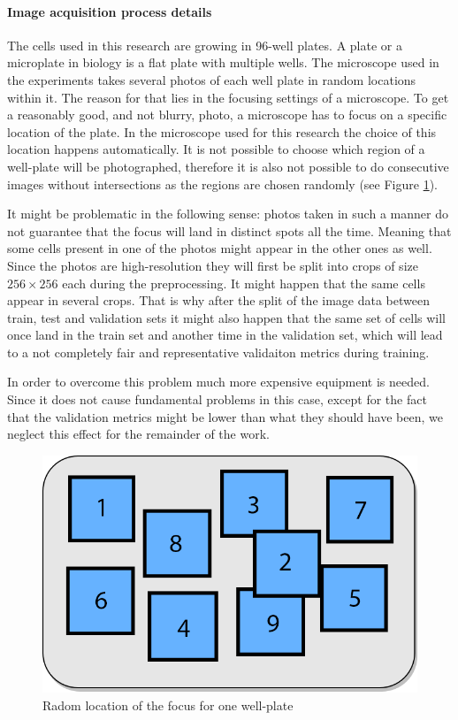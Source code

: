 \paragraph{Image acquisition process details} 
    The cells used in this research are growing in 96-well plates. A plate or a microplate in biology is a flat plate with multiple wells. The microscope used in the experiments takes several photos of each well plate in random locations within it. The reason for that lies in the focusing settings of a  microscope. To get a reasonably good, and not blurry, photo, a microscope has to focus on a specific location of the plate. In the microscope used for this research the choice of this location happens automatically. It is not possible to choose which region of a well-plate will be photographed, therefore it is also not possible to do consecutive images without intersections as the regions are chosen randomly (see Figure \ref{fig:random-dic}). 
    
    It might be problematic in the following sense: photos taken in such a manner do not guarantee that the focus will land in distinct spots all the time. Meaning that some cells present in one of the photos might appear in the other ones as well. Since the photos are high-resolution they will first be split into crops of size $256 \times 256$ each during the preprocessing. It might happen that the same cells appear in several crops. That is why after the split of the image data between train, test and validation sets it might also happen that the same set of cells will once land in the train set and another time in the validation set, which will lead to a not completely fair and representative validaiton metrics during training.
    
    In order to overcome this problem much more expensive equipment is needed. Since it does not cause fundamental problems in this case, except for the fact that the validation metrics might be lower than what they should have been, we neglect this effect for the remainder of the work. 
    
    \begin{figure}[htb]
        \begin{center}
            \includegraphics[width=0.3\linewidth]{bilder/dic-random.png}
            \caption{Radom location of the focus for one well-plate}\label{fig:random-dic}
        \end{center}
    \end{figure}